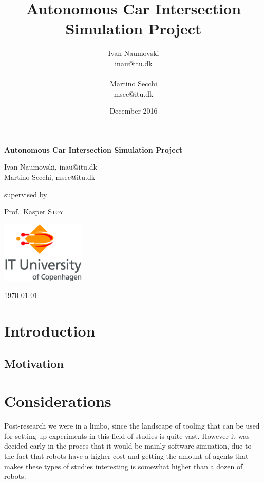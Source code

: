 \documentclass[titlepage]{article}
\title{Autonomous Car Intersection Simulation Project}
\author{
   Ivan Naumovski\\
    {inau@itu.dk}\\
    \\
   Martino Secchi\\
    {msec@itu.dk}\\
}
\date{December 2016}
\begin{document}

\begin{titlepage}
	\centering

	{\huge\bfseries Autonomous Car Intersection Simulation Project \par}
	\vspace{2cm}
	{\Large Ivan Naumovski, {inau@itu.dk}\\ Martino Secchi, {msec@itu.dk}\\\par}
	\vfill
	supervised by\par
	\large Prof.~Kasper \textsc{St\o y}

	\vfill
	\includegraphics[width=0.3\textwidth]{img/itulogo.jpg}\par\vspace{1cm}
	{\large \today\par}
\end{titlepage}

\clearpage
\tableofcontents
\clearpage


\abstract{

}
\section{Introduction}


\subsection{Motivation}


\section{Considerations}
Post-research we were in a limbo, since the landscape of tooling that can be used for setting up experiments in this field of studies is  quite  vast.
However it was decided early in the proces that it would be mainly software simuation, due to the fact that robots have a higher cost and getting the amount of agents that makes these types of studies interesting is somewhat higher than a dozen of robots.
\end{document}
